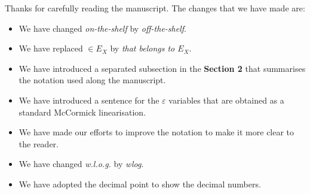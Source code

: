 \documentclass{article}
\newenvironment{reviewer}{\setcounter{pointcounter}{1}}{}
\newcommand{\point}{\text{{\selectfont \thepointcounter} \stepcounter{pointcounter}}}
\begin{document}
\begin{reviewer}
		\begin{tcolorbox}[breakable,enhanced,coltitle=black,colback=green!5!white,colframe=green!75!black,title=\textbf{Answer R2.\point},borderline={1pt}{0pt}{black},boxrule=0pt]
			Thanks for carefully reading the manuscript. The changes that we have made are:
			\begin{itemize}
				\item We have changed \textit{on-the-shelf} by \textit{off-the-shelf}.
				\item We have replaced $\in E_X$ by \textit{ that belongs to $E_X$}.
				\item We have introduced a separated subsection in the \textbf{Section 2} that summarises the notation used along the manuscript.
				\item We have introduced a sentence for the $\varepsilon$ variables that are obtained as a standard McCormick linearisation.
				\item We have made our efforts to improve the notation to make it more clear to the reader.
				\item We have changed \textit{w.l.o.g.} by \textit{wlog}.
				\item We have adopted the decimal point to show the decimal numbers.
			\end{itemize}
		\end{tcolorbox}
	\end{reviewer}
	
	
	
	
	
\end{document}
